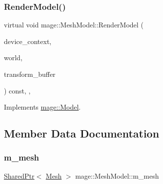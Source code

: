 \hypertarget{classmage_1_1_mesh_model_a92e9f0089386608f1912d459745d470f}{}\label{classmage_1_1_mesh_model_a92e9f0089386608f1912d459745d470f} 
\subsubsection{\texorpdfstring{Render\+Model()}{RenderModel()}}
{\footnotesize\ttfamily virtual void mage\+::\+Mesh\+Model\+::\+Render\+Model (\begin{DoxyParamCaption}\item[{\hyperlink{namespacemage_ae74f374780900893caa5555d1031fd79}{Com\+Ptr}$<$ I\+D3\+D11\+Device\+Context2 $>$}]{device\+\_\+context,  }\item[{const \hyperlink{classmage_1_1_world}{World} \&}]{world,  }\item[{const \hyperlink{structmage_1_1_transform_buffer}{Transform\+Buffer} \&}]{transform\+\_\+buffer }\end{DoxyParamCaption}) const\hspace{0.3cm}{\ttfamily [override]}, {\ttfamily [protected]}, {\ttfamily [virtual]}}



Implements \hyperlink{classmage_1_1_model_a7879cd7c98cefbaf325ee71832275265}{mage\+::\+Model}.



\subsection{Member Data Documentation}
\hypertarget{classmage_1_1_mesh_model_ad9d71a65feff8c14b7272891cd42cfd4}{}\label{classmage_1_1_mesh_model_ad9d71a65feff8c14b7272891cd42cfd4} 
\subsubsection{\texorpdfstring{m\+\_\+mesh}{m\_mesh}}
{\footnotesize\ttfamily \hyperlink{namespacemage_a1e01ae66713838a7a67d30e44c67703e}{Shared\+Ptr}$<$ \hyperlink{classmage_1_1_mesh}{Mesh} $>$ mage\+::\+Mesh\+Model\+::m\+\_\+mesh\hspace{0.3cm}{\ttfamily [private]}}

